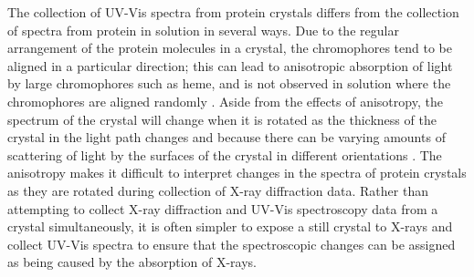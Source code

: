 The collection of UV-Vis spectra from protein crystals differs from the collection of spectra from protein in solution in several ways. Due to the regular arrangement of the protein molecules in a crystal, the chromophores tend to be aligned in a particular direction; this can lead to anisotropic absorption of light by large chromophores such as heme, and is not observed in solution where the chromophores are aligned randomly \cite{Wilmot2002}. Aside from the effects of anisotropy, the spectrum of the crystal will change when it is rotated as the thickness of the crystal in the light path changes and because there can be varying amounts of scattering of light by the surfaces of the crystal in different orientations \cite{Wilmot2002,Dworkowski2015}. The anisotropy makes it difficult to interpret changes in the spectra of protein crystals as they are rotated during collection of X-ray diffraction data. Rather than attempting to collect X-ray diffraction and UV-Vis spectroscopy data from a crystal simultaneously, it is often simpler to expose a still crystal to X-rays and collect UV-Vis spectra to ensure that the spectroscopic changes can be assigned as being caused by the absorption of X-rays.                

  



